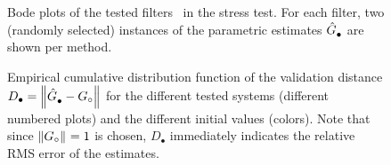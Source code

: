 \begin{figure}[p]
  \setlength{\figurewidth}{0.85\columnwidth}
  \setlength{\figureheight}{0.68\figurewidth}
  \centering
  
  \caption[Bode plots of the stress test filters.]{Bode plots of the tested filters~ in the stress test. 
  For each filter, two (randomly selected) instances of the parametric estimates $\hat{G}_{\mathrm{\bullet}}^{\mathrm{}}$ are shown per method.
  }
  \label{fig:bodeplots}
\end{figure}

\begin{figure}[p]
  \setlength{\figurewidth}{0.85\columnwidth}
  \setlength{\figureheight}{0.68\figurewidth}
  \centering
  
  \caption[Empirical  of $\validationDistance{\bullet}$ in the stress test.]{Empirical cumulative distribution function of the validation distance $D_{\bullet} = \left\| \hat{G}_{\mathrm{\bullet}}^{\mathrm{}} - {G}_{\circ} \right\|_{}$ for the different tested systems (different numbered plots) and the different initial values (colors).
  Note that since $\left\| {G}_{\circ} \right\|_{}=1$ is chosen, $D_{\bullet}$ immediately indicates the relative RMS error of the estimates.
  }
  \label{fig:distancesStress}
\end{figure}

